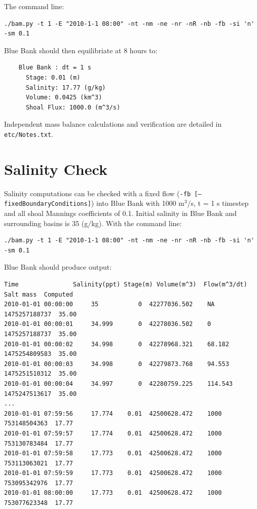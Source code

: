 The command line:

\small
\begin{verbatim}
./bam.py -t 1 -E "2010-1-1 08:00" -nt -nm -ne -nr -nR -nb -fb -si 'n' -sm 0.1
\end{verbatim}
\large

Blue Bank should then equilibriate at 8 hours to:

\small
\begin{verbatim}
    Blue Bank : dt = 1 s
      Stage: 0.01 (m)
      Salinity: 17.77 (g/kg)
      Volume: 0.0425 (km^3)
      Shoal Flux: 1000.0 (m^3/s)
\end{verbatim}
\large

Independent mass balance calculations and verification are detailed in \texttt{etc/Notes.txt}.


\clearpage 
\section{Salinity Check}
\label{sec:Salinty Check}
Salinity computations can be checked with a fixed flow \newline (\texttt{-fb [--fixedBoundaryConditions]}) into Blue Bank with 1000 $\mathrm{m}^3$/s, t = 1 s timestep and all shoal Mannings coefficients of 0.1.  Initial salinity in Blue Bank and surrounding basins is 35 (g/kg).  With the command line:

\small
\begin{verbatim}
./bam.py -t 1 -E "2010-1-1 08:00" -nt -nm -ne -nr -nR -nb -fb -si 'n' -sm 0.1
\end{verbatim}
\large

Blue Bank should produce output:

\small
\begin{verbatim}
Time               Salinity(ppt) Stage(m) Volume(m^3)  Flow(m^3/dt)  Salt mass  Computed
2010-01-01 00:00:00     35           0  42277036.502    NA       1475257188737  35.00
2010-01-01 00:00:01     34.999       0  42278036.502    0        1475257188737  35.00
2010-01-01 00:00:02     34.998       0  42278968.321    68.182   1475254809583  35.00
2010-01-01 00:00:03     34.998       0  42279873.768    94.553   1475251510312  35.00
2010-01-01 00:00:04     34.997       0  42280759.225    114.543  1475247513617  35.00
...
2010-01-01 07:59:56     17.774    0.01  42500628.472    1000      753148504363  17.77
2010-01-01 07:59:57     17.774    0.01  42500628.472    1000      753130783484  17.77
2010-01-01 07:59:58     17.773    0.01  42500628.472    1000      753113063021  17.77
2010-01-01 07:59:59     17.773    0.01  42500628.472    1000      753095342976  17.77
2010-01-01 08:00:00     17.773    0.01  42500628.472    1000      753077623348  17.77
\end{verbatim}
\large

